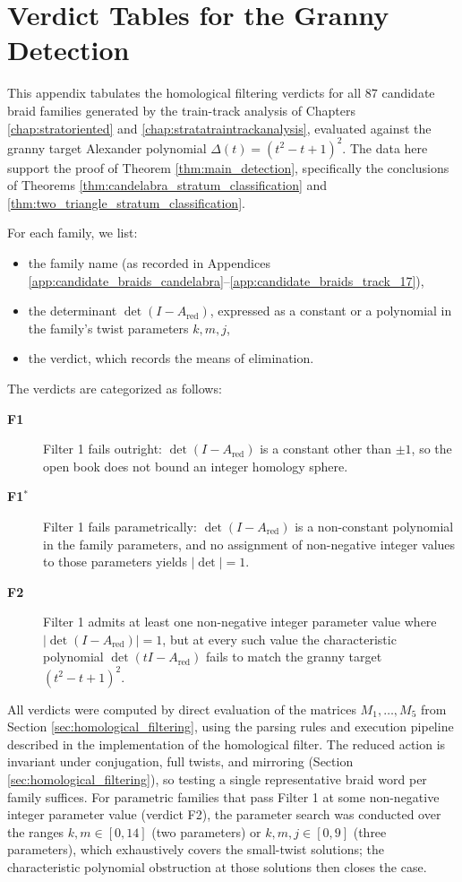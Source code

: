 \chapter{Verdict Tables for the Granny Detection}\label{app:granny_verdict_tables}

This appendix tabulates the homological filtering verdicts for all $87$ candidate braid families generated by the train-track analysis of Chapters \ref{chap:stratoriented} and \ref{chap:stratatraintrackanalysis}, evaluated against the granny target Alexander polynomial $\Delta(t) = (t^2-t+1)^2$. The data here support the proof of Theorem \ref{thm:main_detection}, specifically the conclusions of Theorems \ref{thm:candelabra_stratum_classification} and \ref{thm:two_triangle_stratum_classification}.

For each family, we list:
\begin{itemize}
    \item the family name (as recorded in Appendices \ref{app:candidate_braids_candelabra}--\ref{app:candidate_braids_track_17}),
    \item the determinant $\det(I - A_{\text{red}})$, expressed as a constant or a polynomial in the family's twist parameters $k, m, j$,
    \item the verdict, which records the means of elimination.
\end{itemize}

The verdicts are categorized as follows:
\begin{description}
    \item[\textbf{F1}] Filter 1 fails outright: $\det(I - A_{\text{red}})$ is a constant other than $\pm 1$, so the open book does not bound an integer homology sphere.
    \item[\textbf{F1$^{*}$}] Filter 1 fails parametrically: $\det(I-A_{\text{red}})$ is a non-constant polynomial in the family parameters, and no assignment of non-negative integer values to those parameters yields $|\det| = 1$.
    \item[\textbf{F2}] Filter 1 admits at least one non-negative integer parameter value where $|\det(I - A_{\text{red}})| = 1$, but at every such value the characteristic polynomial $\det(tI - A_{\text{red}})$ fails to match the granny target $(t^2-t+1)^2$.
\end{description}

All verdicts were computed by direct evaluation of the matrices $M_1, \dots, M_5$ from Section \ref{sec:homological_filtering}, using the parsing rules and execution pipeline described in the implementation of the homological filter. The reduced action is invariant under conjugation, full twists, and mirroring (Section \ref{sec:homological_filtering}), so testing a single representative braid word per family suffices. For parametric families that pass Filter 1 at some non-negative integer parameter value (verdict F2), the parameter search was conducted over the ranges $k, m \in [0, 14]$ (two parameters) or $k, m, j \in [0, 9]$ (three parameters), which exhaustively covers the small-twist solutions; the characteristic polynomial obstruction at those solutions then closes the case.

